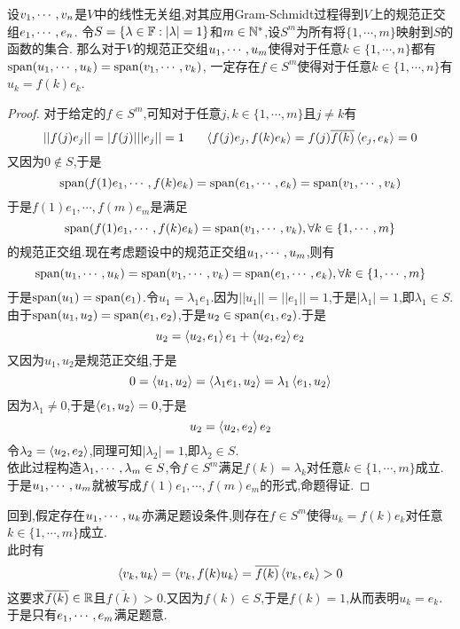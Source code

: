 \documentclass{ctexart}
\begin{document}
\begin{lemma}[Lemma.10]
    设${v}_1,\cdots,{v}_{n}$是$V$中的线性无关组,对其应用Gram-Schmidt过程得到$V$上的规范正交组${e}_1,\cdots,{e}_{n}$.%
    令$S=\{\lambda\in\mathbb{F}:|\lambda|=1\}$和$m\in\mathbb{N}^*$,设$S^m$为所有将$\{1,\cdots,m\}$映射到$S$的函数的集合.%
    那么对于$V$的规范正交组${u}_1,\cdots,{u}_{m}$使得对于任意$k\in\{1,\cdots,n\}$都有$\text{span}({u}_1,\cdots,{u}_{k})=\text{span}({v}_1,\cdots,{v}_{k})$,%
    一定存在$f\in S^{m}$使得对于任意$k\in\{1,\cdots,n\}$有$u_k=f(k)e_k$.
\end{lemma}
\begin{proof}
    对于给定的$f\in S^m$,可知对于任意$j,k\in\{1,\cdots,m\}$且$j\neq k$有
    \[||f(j)e_j||=|f(j)|||e_j||=1\ \ \ \ \ \inprod{f(j)e_j}{f(k)e_k}=f(j)\overline{f(k)}\inprod{e_j}{e_k}=0\]
    又因为$0\notin S$,于是
    \[\text{span}(f(1)e_1,\cdots,f(k)e_k)=\text{span}({e}_1,\cdots,{e}_{k})=\text{span}({v}_1,\cdots,{v}_{k})\]
    于是$f(1)e_1,\cdots,f(m)e_m$是满足
    \[\text{span}(f(1)e_1,\cdots,f(k)e_k)=\text{span}({v}_1,\cdots,{v}_{k}),\forall k\in\{1,\cdots,m\}\]
    的规范正交组.现在考虑题设中的规范正交组${u}_1,\cdots,{u}_{m}$,则有
    \[\text{span}({u}_1,\cdots,{u}_{k})=\text{span}({v}_1,\cdots,{v}_{k})=\text{span}({e}_1,\cdots,{e}_{k}),\forall k\in\{1,\cdots,m\}\]
    于是$\text{span}(u_1)=\text{span}(e_1)$.令$u_1=\lambda_1e_1$.因为$||u_1||=||e_1||=1$,于是$|\lambda_1|=1$,即$\lambda_1\in S$.\\
    由于$\text{span}(u_1,u_2)=\text{span}(e_1,e_2)$,于是$u_2\in\text{span}(e_1,e_2)$.于是
    \[u_2=\left\langle{u_2},{e_1}\right\rangle e_1+\left\langle{u_2},{e_2}\right\rangle e_2\]
    又因为$u_1,u_2$是规范正交组,于是
    \[0=\left\langle{u_1},{u_2}\right\rangle=\left\langle{\lambda_1e_1},{u_2}\right\rangle=\lambda_1\left\langle{e_1},{u_2}\right\rangle\]
    因为$\lambda_1\neq0$,于是$\left\langle{e_1},{u_2}\right\rangle=0$,于是
    \[u_2=\left\langle{u_2},{e_2}\right\rangle e_2\]
    令$\lambda_2=\left\langle{u_2},{e_2}\right\rangle$,同理可知$|\lambda_2|=1$,即$\lambda_2\in S$.\\
    依此过程构造${\lambda}_1,\cdots,{\lambda}_{m}\in S$,令$f\in S^m$满足$f(k)=\lambda_k$对任意$k\in\{1,\cdots,m\}$成立.\\
    于是${u}_1,\cdots,{u}_{m}$就被写成$f(1)e_1,\cdots,f(m)e_m$的形式,命题得证.
\end{proof}
\begin{solution}
    回到,假定存在${u}_1,\cdots,{u}_{k}$亦满足题设条件,则存在$f\in S^m$使得$u_k=f(k)e_k$对任意$k\in\{1,\cdots,m\}$成立.\\
    此时有
    \[\left\langle{v_k},{u_k}\right\rangle=\left\langle{v_k},{f(k)u_k}\right\rangle=\overline{f(k)}\left\langle{v_k},{e_k}\right\rangle>0\]
    这要求$\overline{f(k)}\in\mathbb{R}$且$\overline{f(k)}>0$.又因为$f(k)\in S$,于是$f(k)=1$,从而表明$u_k=e_k$.\\
    于是只有${e}_1,\cdots,{e}_{m}$满足题意.
\end{solution}
\end{document}
